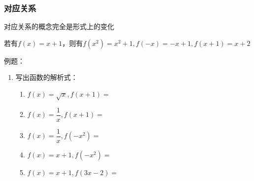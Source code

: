 \subsubsection*{对应关系}
对应关系的概念完全是形式上的变化
\begin{example}
    若有$f(x) = x+1$，则有$f(x^2) = x^2+1, f(-x) = -x+1, f(x+1) = x+2$
\end{example}
例题：
\begin{enumerate}
    \item 写出函数的解析式：
    \begin{enumerate}
        \item $f(x) = \sqrt{x}, f(x+1) = $ 
        \item $f(x) = \dfrac{1}{x}, f(x+1) =$  
        \item $f(x) = \dfrac{1}{x}, f(-x^2) =$  
        \item $f(x) = x+1, f(-x^2) =$  
        \item $f(x) = x+1, f(3x-2) =$  
    \end{enumerate}
    

\end{enumerate}
